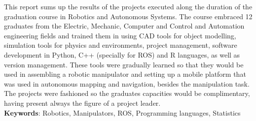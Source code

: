 \begin{thesisabastract}
This report sums up the results of the projects executed along the duration of the graduation course in Robotics and Autonomous Systems. The
course embraced 12 graduates from the Electric, Mechanic, Computer and Control and Automation engineering fields and trained them in using CAD tools for object modelling, simulation tools for physics and environments, project management, software development in Python, C++ (specially for ROS) and R languages, as well as version management. These tools were gradually learned so that they would be used in assembling a robotic manipulator and setting up a mobile platform that was used in autonomous mapping and navigation, besides the manipulation task. The projects were fashioned so the graduates capacities would be complimentary, having present always the figure of a project leader.
\ \\

\textbf{Keywords}: Robotics, Manipulators, ROS, Programming languages, Statistics

\end{thesisabastract}

